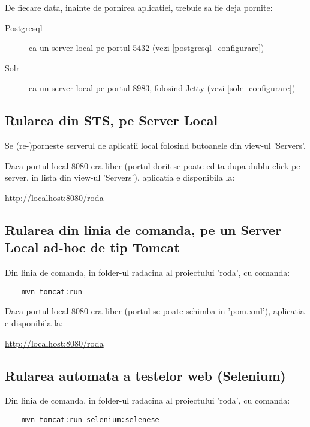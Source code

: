 De fiecare data, inainte de pornirea aplicatiei, trebuie sa fie deja pornite:
\begin{description}
\item[Postgresql] ca un server local pe portul 5432 (vezi \ref{postgresql_configurare})
\item[Solr] ca un server local pe portul 8983, folosind Jetty (vezi \ref{solr_configurare})
\end{description}

\subsection{Rularea din STS, pe Server Local}
Se (re-)porneste serverul de aplicatii local folosind butoanele din view-ul
'Servers'.

Daca portul local 8080 era liber (portul dorit se poate edita dupa dublu-click pe
server, in lista din view-ul 'Servers'), aplicatia e disponibila la:

\url{http://localhost:8080/roda}

\subsection{Rularea din linia de comanda, pe un Server Local ad-hoc de tip
Tomcat}
Din linia de comanda, in folder-ul radacina al proiectului 'roda', cu comanda:
\begin{lstlisting}
	mvn tomcat:run
\end{lstlisting}
Daca portul local 8080 era liber (portul se poate schimba in 'pom.xml'),
aplicatia e disponibila la:

\url{http://localhost:8080/roda}

\subsection{Rularea automata a testelor web (Selenium)}
Din linia de comanda, in folder-ul radacina al proiectului 'roda', cu comanda:
\begin{lstlisting}
	mvn tomcat:run selenium:selenese
\end{lstlisting}

